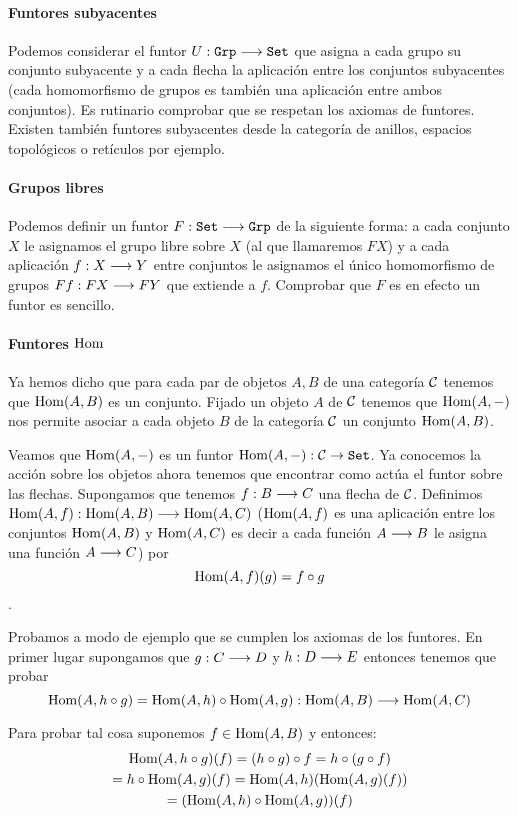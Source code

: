 \paragraph{Funtores subyacentes}
Podemos considerar el funtor $U : \texttt{Grp}\longrightarrow \texttt{Set}$
que asigna a cada grupo su conjunto subyacente y a cada flecha la
aplicación entre los conjuntos subyacentes (cada homomorfismo de
grupos es también una aplicación entre ambos conjuntos). Es rutinario
comprobar que se respetan los axiomas de funtores. Existen también
funtores subyacentes desde la categoría de anillos, espacios topológicos
o retículos por ejemplo.

\paragraph{Grupos libres}
Podemos definir un funtor $F : \texttt{Set}\longrightarrow \texttt{Grp}$ de la siguiente
forma: a cada conjunto $X$ le asignamos el grupo libre sobre $X$
(al que llamaremos $F X$) y a
cada aplicación $f : X\longrightarrow Y$ entre conjuntos le asignamos el
único homomorfismo de grupos $F f: F X\longrightarrow F Y$ que extiende a $f$.
Comprobar que
$F$ es en efecto un funtor es sencillo.

\paragraph{Funtores $\operatorname{Hom}$}
Ya hemos dicho que para cada par de objetos $A, B$ de
una categoría $\mathcal{C}$ tenemos que
$\operatorname{Hom}(A, B)$ es un conjunto. Fijado un objeto $A$ de
$\mathcal{C}$ tenemos que $\operatorname{Hom}(A, -)$ nos permite asociar a cada
objeto $B$ de la categoría $\mathcal{C}$ un conjunto $\operatorname{Hom}(A, B)$.

Veamos que $\operatorname{Hom}(A, -)$ es un funtor
$\operatorname{Hom}(A, -) : \mathcal{C} \rightarrow \texttt{Set}$. Ya conocemos la acción
sobre los objetos ahora tenemos que encontrar como actúa
el funtor sobre las flechas. Supongamos que tenemos
$f : B\longrightarrow C$ una flecha de $\mathcal{C}$. Definimos
$\operatorname{Hom}(A, f) : \operatorname{Hom}(A, B)\longrightarrow \operatorname{Hom}(A, C)$
($\operatorname{Hom}(A, f)$ es una aplicación entre los conjuntos
$\operatorname{Hom}(A, B)$ y $\operatorname{Hom}(A, C)$ es decir a cada función $A\longrightarrow B$
le asigna una función $A\longrightarrow C$) por
$$\operatorname{Hom}(A, f)(g) = f \circ g $$.

Probamos a modo de ejemplo
que se cumplen los axiomas de los funtores. En primer lugar
supongamos que $g : C\longrightarrow D$ y $h : D\longrightarrow E$ entonces tenemos
que probar
$$\operatorname{Hom}(A, h \circ g) = \operatorname{Hom}(A, h) \circ \operatorname{Hom}(A, g) :
\operatorname{Hom}(A, B)\longrightarrow \operatorname{Hom}(A, C)$$

Para probar tal cosa suponemos $f \in \operatorname{Hom}(A, B)$ y entonces:
\begin{multline*}
\operatorname{Hom}(A, h\circ g)(f) = (h \circ g) \circ f = h \circ (g \circ f) \\
= h \circ \operatorname{Hom}(A, g)(f) = \operatorname{Hom}(A, h)(\operatorname{Hom}(A, g)(f)) \\
= (\operatorname{Hom}(A, h) \circ \operatorname{Hom}(A, g))(f)
\end{multline*}

